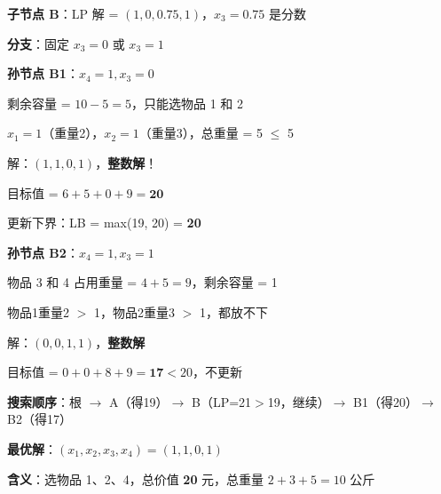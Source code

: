 \documentclass[12pt, a4paper]{ctexart}
\begin{document}
\begin{blackboard}

\textbf{子节点 B}：LP 解 = $(1, 0, 0.75, 1)$，$x_3 = 0.75$ 是分数

\textbf{分支}：固定 $x_3 = 0$ 或 $x_3 = 1$

\textbf{孙节点 B1}：$x_4 = 1, x_3 = 0$

剩余容量 = $10 - 5 = 5$，只能选物品 1 和 2

$x_1 = 1$（重量2），$x_2 = 1$（重量3），总重量 = 5 $\leq$ 5 \checkmark

解：$(1, 1, 0, 1)$，\textbf{整数解}！

目标值 = $6 + 5 + 0 + 9 = \mathbf{20}$

更新下界：LB = max(19, 20) = \textbf{20}

\textbf{孙节点 B2}：$x_4 = 1, x_3 = 1$

物品 3 和 4 占用重量 = $4 + 5 = 9$，剩余容量 = 1

物品1重量2 $>$ 1，物品2重量3 $>$ 1，都放不下

解：$(0, 0, 1, 1)$，\textbf{整数解}

目标值 = $0 + 0 + 8 + 9 = \mathbf{17} < 20$，不更新

\end{blackboard}

\begin{blackboard}[完整搜索树]

\begin{center}
\end{center}

\textbf{搜索顺序}：根 $\to$ A（得19）$\to$ B（LP=21$>$19，继续）$\to$ B1（得20）$\to$ B2（得17）

\textbf{最优解}：$(x_1, x_2, x_3, x_4) = (1, 1, 0, 1)$

\textbf{含义}：选物品 1、2、4，总价值 \textbf{20} 元，总重量 $2+3+5=10$ 公斤

\end{blackboard}
\end{document}

